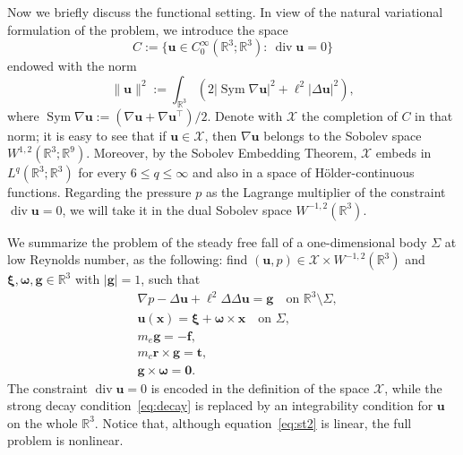 \documentclass[final]{amsart}
\theoremstyle{definition}
\theoremstyle{definition}
\theoremstyle{remark}
\begin{document}
Now we briefly discuss the functional setting. In view of the natural
variational formulation of the problem, we introduce the space
\[
C:=\{{\boldsymbol u}\in C^\infty_0({\mathbb R}^3;{\mathbb R}^3):\ {\operatorname{\mathrm{div}}}{\boldsymbol u}=0\}
\]
endowed with the norm
\[
\|{\boldsymbol u}\|^2:= \int_{{\mathbb R}^3}\left(2|{\operatorname{\mathrm{Sym}}}\nabla{\boldsymbol u}|^2+\ell^2|{\Delta}{\boldsymbol u}|^2\right),
\]
where ${\operatorname{\mathrm{Sym}}}\nabla{\boldsymbol u}:=(\nabla{\boldsymbol u}+\nabla{\boldsymbol u}^{\intercal})/2$.  Denote
with $\mathcal{X}$ the completion of $C$ in that norm; it is easy to
see that if ${\boldsymbol u}\in \mathcal{X}$, then $\nabla{\boldsymbol u}$ belongs to the
Sobolev space $W^{1,2}({\mathbb R}^3;{\mathbb R}^9)$. Moreover, by the Sobolev Embedding
Theorem, $\mathcal{X}$ embeds in $L^q({\mathbb R}^3;{\mathbb R}^3)$ for every $6\leq
q\leq \infty$ and also in a space of H\"older-continuous functions.
Regarding the pressure $p$ as the Lagrange multiplier of the
constraint ${\operatorname{\mathrm{div}}}{\boldsymbol u}=0$, we will take it in the dual Sobolev space
$W^{-1,2}({\mathbb R}^3)$.

We summarize the problem of the steady free fall of a one-dimensional
body ${\Sigma}$ at low Reynolds number, as the following: find $({\boldsymbol u},p)\in \mathcal{X}\times W^{-1,2}({\mathbb R}^3)$ and
${\boldsymbol \xi},{\boldsymbol \omega},{\boldsymbol g}\in{\mathbb R}^3$ with $|{\boldsymbol g}|=1$, such that
\begin{align}
& \nabla p - \Delta {\boldsymbol u} +\ell^2\Delta\Delta {\boldsymbol u} = {\boldsymbol g}
\quad\text{on ${\mathbb R}^3\setminus {\Sigma}$},\label{eq:st2}\\
&{\boldsymbol u}({\boldsymbol x})={\boldsymbol \xi}+{\boldsymbol \omega}\times{\boldsymbol x}\quad\text{on ${\Sigma}$},\label{eq:st3}\\
&m_e{\boldsymbol g} = -{\boldsymbol f},\label{eq:st4}\\
&m_c{\boldsymbol r}\times{\boldsymbol g} = {\boldsymbol t},\label{eq:st5}\\
&{\boldsymbol g}\times{\boldsymbol \omega}={\boldsymbol 0}.\label{eq:st6}
\end{align}
The constraint ${\operatorname{\mathrm{div}}}{\boldsymbol u}=0$ is encoded in the definition of the space
$\mathcal{X}$, while the strong decay condition~\eqref{eq:decay} is replaced by
an integrability condition for ${\boldsymbol u}$ on the whole ${\mathbb R}^3$. Notice
that, although equation~\eqref{eq:st2} is linear, the full problem is
nonlinear.
\end{document}
